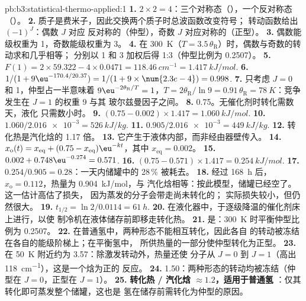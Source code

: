 \begin{solution}{pb:b3:statistical-thermo-applied:1}
\textbf{1.} $2 \times 2 = 4$：三个对称态（），一个反对称态（）。
\textbf{2.} 质子是费米子，因此交换两个质子时总波函数改变符号；
转动函数给出 $(-1)^J$：偶数 $J$ 对应
反对称的（仲型），奇数 $J$ 对应对称的（正型）。
\textbf{3.} 偶数能级权重为 1，奇数能级权重为 3。
\textbf{4.} 在 \qty{300}{K}（$T = 3.5\,\theta_{\mathrm R}$）时，偶数与奇数的转动求和几乎相等；
分别以 1 和 3 加权后得 1:3（仲型比例为 0.2507）。
\textbf{5.} $F(1) = 2 \times 59.322 - 4 \times 0.0471 = \qty{118.46}{cm^{-1}} = \qty{1.417}{kJ/mol}$.
\textbf{6.} $1/(1 + 9\eu^{-170.4/20.37}) = 1/(1 + 9 \times \num{2.3e-4}) = 0.998$.
\textbf{7.} 只考虑 $J = 0$ 和 1，仲型占一半意味着 $9\eu^{-2\theta_{\mathrm R}/T} = 1$，$T = 2\theta_{\mathrm R}/\ln9 =
0.91\,\theta_{\mathrm R} = \qty{78}{K}$：竞争发生在 $J = 1$ 的权重 9 与其
玻尔兹曼因子之间。
\textbf{8.} 0.75。无催化剂时转化需数天，液化
只需数小时。
\textbf{9.} $(0.75 - 0.002) \times 1.417 = \qty{1.060}{kJ/mol}$.
\textbf{10.} $1.060/\num{2.016e-3} = \qty{526}{kJ/kg}$.
\textbf{11.} $0.905/\num{2.016e-3} = \qty{449}{kJ/kg}$.
\textbf{12.} 转化热是汽化焓的 1.17 倍。
\textbf{13.} 它产生于液体内部，而非经由器壁传入。
\textbf{14.} $x_{\mathrm o}(t) = x_{\mathrm{eq}} + (0.75 - x_{\mathrm{eq}})\eu^{-kt}$，其中 $x_{\mathrm{eq}} = 0.002$。
\textbf{15.} $0.002 + 0.748\eu^{-0.274} = 0.571$.
\textbf{16.} $(0.75 - 0.571) \times 1.417 = \qty{0.254}{kJ/mol}$.
\textbf{17.} $0.254/0.905 = 0.28$：一天内储罐中的 28\,\% 被耗去。
\textbf{18.} 经过 \qty{168}{h} 后，$x_{\mathrm o} = 0.112$，热量为 \qty{0.904}{kJ/mol}，与
汽化焓相等：按此模型，储罐已经空了。这一估计高估了损失，
因为蒸发的分子会带走尚未转化的；
实际损失较小，但仍然很大。
\textbf{19.} $t_{1/2} = \ln2/0.0114 = \qty{61}{h}$.
\textbf{20.} 在液化器中，于逐级降温的催化剂床上进行，以使
制冷机在液体储存前即移走转化热。
\textbf{21.} 是：\qty{300}{K} 时平衡仲型比例为 0.2507。
\textbf{22.} 在普通氢中，两种形态不能相互转化，因此各自
的转动被冻结在各自的能级阶梯上；在平衡氢中，
所供热量的一部分使仲型转化为正型。
\textbf{23.} 在 \qty{50}{K} 附近约为 3.57：除激发转动外，热量还使
分子从 $J = 0$ 到 $J = 1$（高出 \qty{118}{cm^{-1}}），这是一个焓为正的
反应。
\textbf{24.} 1.50：两种形态的转动均被冻结（仲型在 $J = 0$，正型在 $J = 1$）。
\textbf{25.} \textbf{转化热 / 汽化焓 $\approx 1.2$，适用于普通氢
}：仅其转化即可蒸发整个储罐，这也是
氢在储存前需转化为仲型的原因。
\end{solution}
